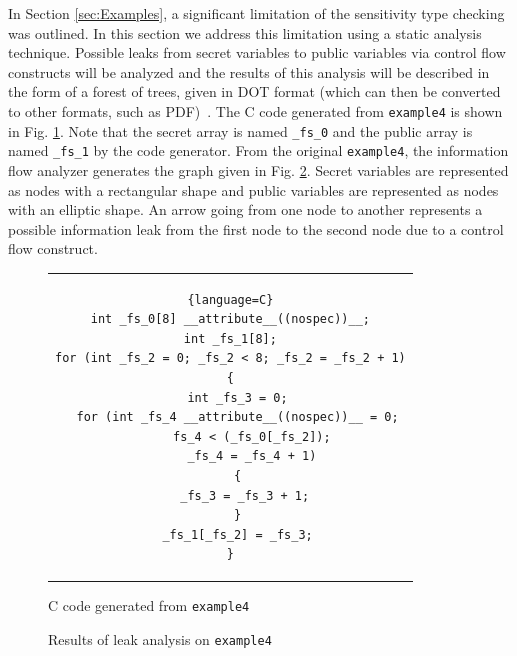 \documentclass[10pt, conference]{IEEEtran}
\newcommand{\ttt}{\texttt}
\begin{document}
In Section \ref{sec:Examples}, a significant limitation of the sensitivity type checking
was outlined. In this section we address this limitation using a static analysis technique.
Possible leaks from secret variables to public variables via control flow constructs will
be analyzed and the results of this analysis will be described in the form of
a forest of trees, given in DOT format (which can then be converted to other formats,
such as PDF)~\cite{DOT}. The C code generated from \ttt{example4} is shown in Fig. \ref{fig:GenC4}.
Note that the secret array is named \verb|_fs_0| and the public array is named \verb|_fs_1| by the
code generator. From the original \ttt{example4}, the information flow analyzer generates the
graph given in Fig. \ref{fig:Analysis4}. Secret variables are represented as nodes with
a rectangular shape and public variables are represented as nodes with an elliptic shape. An
arrow going from one node to another represents a possible information leak from the first
node to the second node due to a control flow construct.

\begin{figure}
\begin{center}
\begin{tabular}{c}
\begin{lstlisting}{language=C}
int _fs_0[8] __attribute__((nospec))__;
int _fs_1[8];
for (int _fs_2 = 0; _fs_2 < 8; _fs_2 = _fs_2 + 1)
{
  int _fs_3 = 0;
  for (int _fs_4 __attribute__((nospec))__ = 0;
      fs_4 < (_fs_0[_fs_2]);
      _fs_4 = _fs_4 + 1)
  {
    _fs_3 = _fs_3 + 1;
  }
  _fs_1[_fs_2] = _fs_3;
}
\end{lstlisting}
\end{tabular}
\end{center}
\caption{C code generated from \ttt{example4}}
\label{fig:GenC4}
\end{figure}

\begin{figure}
\centering
\caption{Results of leak analysis on \ttt{example4}}
\label{fig:Analysis4}
\end{figure}
\end{document}
